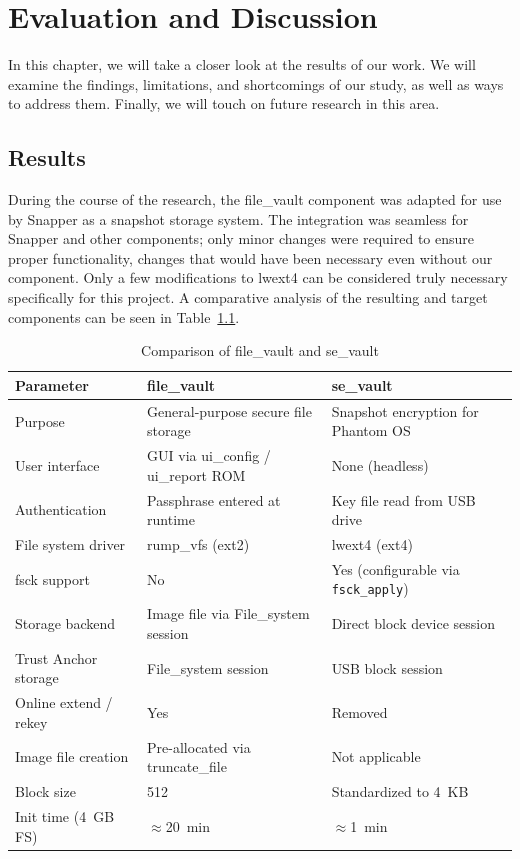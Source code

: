 \chapter{Evaluation and Discussion}

In this chapter, we will take a closer look at the results of our work. We will examine the findings, limitations, and shortcomings of our study, as well as ways to address them. Finally, we will touch on future research in this area.

\section{Results}


During the course of the research, the file\_vault component was adapted for use by Snapper as a snapshot storage system. The integration was seamless for Snapper and other components; only minor changes were required to ensure proper functionality, changes that would have been necessary even without our component. Only a few modifications to lwext4 can be considered truly necessary specifically for this project. A comparative analysis of the resulting and target components can be seen in Table~\ref{tab:vault_comparison}.

\begin{table}[H]
\centering
\caption{Comparison of file\_vault and se\_vault}
\label{tab:vault_comparison}
\begin{tabular}{|p{4.2cm}|p{5.2cm}|p{5.2cm}|}
\toprule
\textbf{Parameter} & \textbf{file\_vault} & \textbf{se\_vault} \\
\midrule
Purpose & General-purpose secure file storage & Snapshot encryption for Phantom OS \\
\midrule
User interface & GUI via ui\_config / ui\_report ROM & None (headless) \\
\midrule
Authentication & Passphrase entered at runtime & Key file read from USB drive \\
\midrule
File system driver & rump\_vfs (ext2) & lwext4 (ext4) \\
\midrule
fsck support & No & Yes (configurable via \texttt{fsck\_apply}) \\
\midrule
Storage backend & Image file via File\_system session & Direct block device session \\
\midrule
Trust Anchor storage & File\_system session & USB block session \\
\midrule
Online extend / rekey & Yes & Removed \\
\midrule
Image file creation & Pre-allocated via truncate\_file & Not applicable \\
\midrule
Block size & 512 & Standardized to 4~KB \\
\midrule
Init time (4~GB FS) & $\approx$20~min & $\approx$1~min \\
\bottomrule
\end{tabular}
\end{table}

